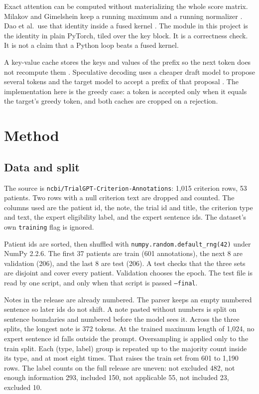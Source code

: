 \documentclass[conference]{IEEEtran}
\begin{document}
Exact attention can be computed without materializing the whole score matrix.
Milakov and Gimelshein keep a running maximum and a running normalizer \cite{milakov2018online}.
Dao et al.\ use that identity inside a fused kernel \cite{dao2022flashattention}.
The module in this project is the identity in plain PyTorch, tiled over the key block.
It is a correctness check. It is not a claim that a Python loop beats a fused kernel.

A key-value cache stores the keys and values of the prefix so the next token does not recompute them \cite{vaswani2017attention}.
Speculative decoding uses a cheaper draft model to propose several tokens and the target model to accept a prefix of that proposal \cite{leviathan2023speculative}.
The implementation here is the greedy case: a token is accepted only when it equals the target's greedy token, and both caches are cropped on a rejection.

\section{Method}
\subsection{Data and split}
The source is \texttt{ncbi/TrialGPT-Criterion-Annotations}: 1{,}015 criterion rows, 53 patients.
Two rows with a null criterion text are dropped and counted.
The columns used are the patient id, the note, the trial id and title, the criterion type and text, the expert eligibility label, and the expert sentence ids.
The dataset's own \texttt{training} flag is ignored.

Patient ids are sorted, then shuffled with \texttt{numpy.random.default\_rng(42)} under NumPy 2.2.6.
The first 37 patients are train (601 annotations), the next 8 are validation (206), and the last 8 are test (206).
A test checks that the three sets are disjoint and cover every patient.
Validation chooses the epoch.
The test file is read by one script, and only when that script is passed \texttt{--final}.

Notes in the release are already numbered.
The parser keeps an empty numbered sentence so later ids do not shift.
A note pasted without numbers is split on sentence boundaries and numbered before the model sees it.
Across the three splits, the longest note is 372 tokens.
At the trained maximum length of 1{,}024, no expert sentence id falls outside the prompt.
Oversampling is applied only to the train split.
Each (type, label) group is repeated up to the majority count inside its type, and at most eight times.
That raises the train set from 601 to 1{,}190 rows.
The label counts on the full release are uneven: not excluded 482, not enough information 293, included 150, not applicable 55, not included 23, excluded 10.
\end{document}
